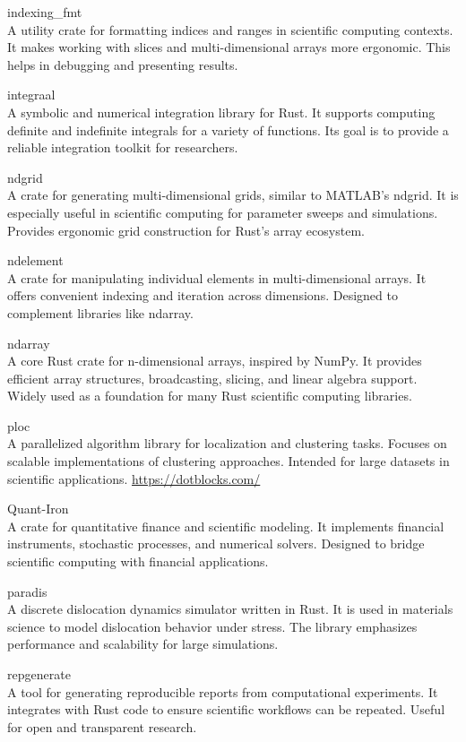 \documentclass{article}
\begin{document}
indexing\_fmt\\
A utility crate for formatting indices and ranges in scientific computing contexts.
It makes working with slices and multi-dimensional arrays more ergonomic. This helps in debugging
and presenting results.

integraal\\
A symbolic and numerical integration library for Rust. It supports computing definite
and indefinite integrals for a variety of functions. Its goal is to provide a reliable integration
toolkit for researchers.

ndgrid\\
A crate for generating multi-dimensional grids, similar to MATLAB’s ndgrid. It is
especially useful in scientific computing for parameter sweeps and simulations. Provides ergonomic
grid construction for Rust’s array ecosystem.

ndelement\\
A crate for manipulating individual elements in multi-dimensional arrays. It offers
convenient indexing and iteration across dimensions. Designed to complement libraries like ndarray.

ndarray\\
A core Rust crate for n-dimensional arrays, inspired by NumPy. It provides efficient
array structures, broadcasting, slicing, and linear algebra support. Widely used as a foundation
for many Rust scientific computing libraries.

ploc\\
A parallelized algorithm library for localization and clustering tasks. Focuses on scalable
implementations of clustering approaches. Intended for large datasets in scientific applications.
\url{https://dotblocks.com/}

Quant-Iron\\
A crate for quantitative finance and scientific modeling. It implements financial
instruments, stochastic processes, and numerical solvers. Designed to bridge scientific computing
with financial applications.

paradis\\
A discrete dislocation dynamics simulator written in Rust. It is used in materials
science to model dislocation behavior under stress. The library emphasizes performance and
scalability for large simulations.

repgenerate\\
A tool for generating reproducible reports from computational experiments. It
integrates with Rust code to ensure scientific workflows can be repeated. Useful for open and
transparent research.
\end{document}
